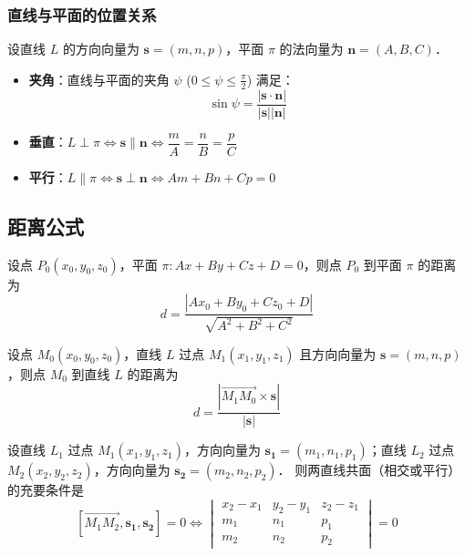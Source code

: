 \documentclass[12pt, a4paper, oneside, UTF8]{ctexbook}
\begin{document}
\subsubsection{直线与平面的位置关系}
设直线 $L$ 的方向向量为 $\boldsymbol{s}=(m, n, p)$，平面 $\pi$ 的法向量为 $\boldsymbol{n}=(A, B, C)$．

\begin{itemize}
    \item \textbf{夹角}：直线与平面的夹角 $\psi$ ($0 \le \psi \le \frac{\pi}{2}$) 满足：
    \[ 
        \sin\psi = \frac{|\boldsymbol{s} \cdot \boldsymbol{n}|}{|\boldsymbol{s}||\boldsymbol{n}|} 
    \]
    \item \textbf{垂直}：$L \perp \pi \iff \boldsymbol{s} \parallel \boldsymbol{n} \iff \dfrac{m}{A}=\dfrac{n}{B}=\dfrac{p}{C}$
    \item \textbf{平行}：$L \parallel \pi \iff \boldsymbol{s} \perp \boldsymbol{n} \iff Am+Bn+Cp=0$
\end{itemize}

\subsection{距离公式}

\begin{theorem}[点到平面的距离]
    设点 $P_0(x_0, y_0, z_0)$，平面 $\pi: Ax + By + Cz + D = 0$，则点 $P_0$ 到平面 $\pi$ 的距离为
    \[
        d = \frac{|Ax_0 + By_0 + Cz_0 + D|}{\sqrt{A^2 + B^2 + C^2}}
    \]
\end{theorem}

\begin{theorem}[点到直线的距离]
    设点 $M_0(x_0, y_0, z_0)$，直线 $L$ 过点 $M_1(x_1, y_1, z_1)$ 且方向向量为 $\boldsymbol{s} = (m, n, p)$，则点 $M_0$ 到直线 $L$ 的距离为
    \[
        d = \frac{\left|\overrightarrow{M_1M_0} \times \boldsymbol{s}\right|}{|\boldsymbol{s}|}
    \]
\end{theorem}

\begin{theorem}[两直线共面的条件]
    设直线 $L_1$ 过点 $M_1(x_1, y_1, z_1)$，方向向量为 $\boldsymbol{s_1} = (m_1, n_1, p_1)$；直线 $L_2$ 过点 $M_2(x_2, y_2, z_2)$，方向向量为 $\boldsymbol{s_2} = (m_2, n_2, p_2)$．
    则两直线共面（相交或平行）的充要条件是
    \[
        [\overrightarrow{M_1M_2}, \boldsymbol{s_1}, \boldsymbol{s_2}] = 0 \iff \begin{vmatrix} x_2-x_1 & y_2-y_1 & z_2-z_1 \\ m_1 & n_1 & p_1 \\ m_2 & n_2 & p_2 \end{vmatrix} = 0
    \]
\end{theorem}
\end{document}
